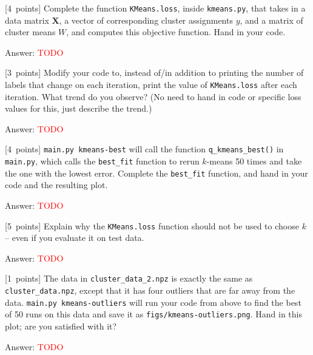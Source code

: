 \documentclass{article}
\newcommand{\ask}[1]{\textcolor{question}{#1}}
\newenvironment{answer}{\par\begingroup\color{answer}Answer: }{\endgroup}
\newcommand{\red}[1]{\textcolor{red}{#1}}
\newcommand{\pts}[1]{\textcolor{points}{[#1~points]}}
\newcommand{\TODO}{\red{TODO}}
\newcommand{\bX}{\mathbf{X}}
\begin{document}
\begin{qlist}
 \item \pts{4} Complete the function \texttt{KMeans.loss}, inside \texttt{kmeans.py}, that takes in a data matrix $\bX$, a vector of corresponding cluster assignments $y$, and a matrix of cluster means $W$, and computes this objective function. \ask{Hand in your code.}
\begin{answer}\TODO\end{answer}


 \item \pts{3} Modify your code to, instead of/in addition to printing the number of labels that change on each iteration, print the value of \texttt{KMeans.loss} after each iteration. \ask{What trend do you observe?} (No need to hand in code or specific loss values for this, just describe the trend.)
\begin{answer}\TODO\end{answer}

 \item \pts{4} \texttt{main.py kmeans-best} will call the function \verb|q_kmeans_best()| in \texttt{main.py}, which calls the \verb|best_fit| function to rerun $k$-means 50 times and take the one with the lowest error. Complete the \verb|best_fit| function, and \ask{hand in your code and the resulting plot}.
\begin{answer}\TODO\end{answer}

 \item \pts{5} \ask{Explain why} the \texttt{KMeans.loss} function should not be used to choose $k$ -- even if you evaluate it on test data.
\begin{answer}\TODO\end{answer}


 \item \pts{1} The data in \texttt{cluster\_data\_2.npz} is exactly the same as \texttt{cluster\_data.npz}, except that it has four outliers that are far away from the data. \texttt{main.py kmeans-outliers} will run your code from above to find the best of 50 runs on this data and save it as \texttt{figs/kmeans-outliers.png}. \ask{Hand in this plot; are you satisfied with it?}
 \begin{answer}\TODO\end{answer}


\end{qlist}
\end{document}
